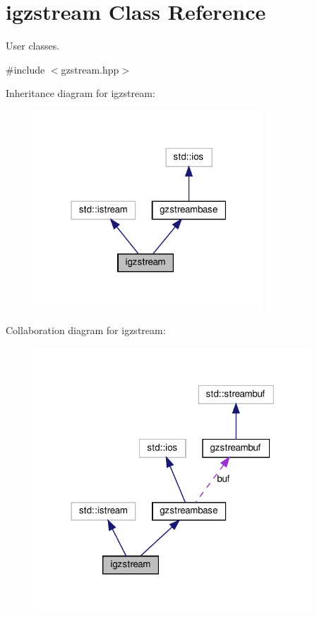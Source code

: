 \hypertarget{classigzstream}{}\section{igzstream Class Reference}
\label{classigzstream}




 User classes.  




{\ttfamily \#include $<$gzstream.\+hpp$>$}



Inheritance diagram for igzstream\+:
\nopagebreak
\begin{figure}[H]
\begin{center}
\leavevmode
\includegraphics[width=244pt]{d4/d8e/classigzstream__inherit__graph}
\end{center}
\end{figure}


Collaboration diagram for igzstream\+:
\nopagebreak
\begin{figure}[H]
\begin{center}
\leavevmode
\includegraphics[width=295pt]{d5/dbd/classigzstream__coll__graph}
\end{center}
\end{figure}
